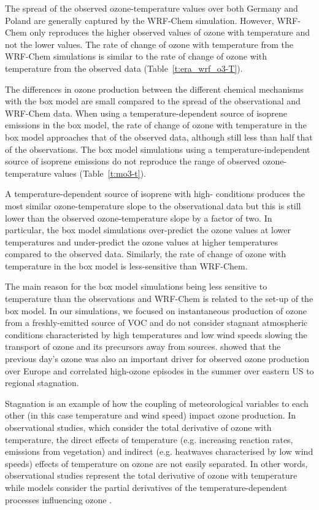The spread of the observed ozone-temperature values over both Germany and Poland are generally captured by the WRF-Chem simulation.
However, WRF-Chem only reproduces the higher observed values of ozone with temperature and not the lower values.
The rate of change of ozone with temperature from the WRF-Chem simulations is similar to the rate of change of ozone with temperature from the observed data (Table~\ref{t:era_wrf_o3-T}).

The differences in ozone production between the different chemical mechanisms with the box model are small compared to the spread of the observational and WRF-Chem data.
When using a temperature-dependent source of isoprene emissions in the box model, the rate of change of ozone with temperature in the box model approaches that of the observed data, although still less than half that of the observations.
The box model simulations using a temperature-independent source of isoprene emissions do not reproduce the range of observed ozone-temperature values (Table~\ref{t:mo3-t}).

A temperature-dependent source of isoprene with high- conditions produces the most similar ozone-temperature slope to the observational data but this is still lower than the observed ozone-temperature slope by a factor of two.
In particular, the box model simulations over-predict the ozone values at lower temperatures and under-predict the ozone values at higher temperatures compared to the observed data.
Similarly, the rate of change of ozone with temperature in the box model is less-sensitive than WRF-Chem.

The main reason for the box model simulations being less sensitive to temperature than the observations and WRF-Chem is related to the set-up of the box model.
In our simulations, we focused on instantaneous production of ozone from a freshly-emitted source of VOC and do not consider stagnant atmospheric conditions characteristed by high temperatures and low wind speeds slowing the transport of ozone and its precursors away from sources.
\citet{Otero:2016} showed that the previous day's ozone was also an important driver for observed ozone production over Europe and \citet{Jacob:1993} correlated high-ozone episodes in the summer over eastern US to regional stagnation.

Stagnation is an example of how the coupling of meteorological variables to each other (in this case temperature and wind speed) impact ozone production.
In observational studies, which consider the total derivative of ozone with temperature, the direct effects of temperature (e.g. increasing reaction rates, emissions from vegetation) and indirect (e.g. heatwaves characterised by low wind speeds) effects of temperature on ozone are not easily separated.
In other words, observational studies represent the total derivative of ozone with temperature while models consider the partial derivatives of the temperature-dependent processes influencing ozone \citep{Rasmussen:2013}. 

